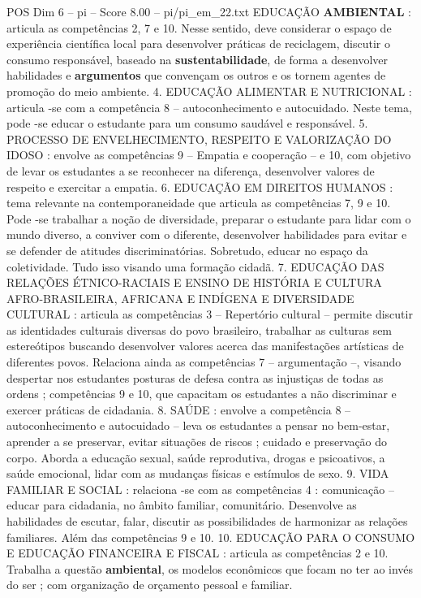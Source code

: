 \begin{textsample}{POS Dim 6 – pi – Score 8.00 – pi/pi\_em\_22.txt}
EDUCAÇÃO \textbf{AMBIENTAL} : articula as competências 2, 7 e 10.
Nesse sentido, deve considerar o espaço de experiência científica local para desenvolver práticas de reciclagem, discutir o consumo responsável, baseado na \textbf{sustentabilidade}, de forma a desenvolver habilidades e \textbf{argumentos} que convençam os outros e os tornem agentes de promoção do meio ambiente. 4.
EDUCAÇÃO ALIMENTAR E NUTRICIONAL : articula -se com a competência 8 – autoconhecimento e autocuidado.
Neste tema, pode -se educar o estudante para um consumo saudável e responsável. 5.
PROCESSO DE ENVELHECIMENTO, RESPEITO E VALORIZAÇÃO DO IDOSO : envolve as competências 9 – Empatia e cooperação – e 10, com objetivo de levar os estudantes a se reconhecer na diferença, desenvolver valores de respeito e exercitar a empatia. 6.
EDUCAÇÃO EM DIREITOS HUMANOS : tema relevante na contemporaneidade que articula as competências 7, 9 e 10.
Pode -se trabalhar a noção de diversidade, preparar o estudante para lidar com o mundo diverso, a conviver com o diferente, desenvolver habilidades para evitar e se defender de atitudes discriminatórias.
Sobretudo, educar no espaço da coletividade.
Tudo isso visando uma formação cidadã. 7.
EDUCAÇÃO DAS RELAÇÕES ÉTNICO-RACIAIS E ENSINO DE HISTÓRIA E CULTURA AFRO-BRASILEIRA, AFRICANA E INDÍGENA E DIVERSIDADE CULTURAL : articula as competências 3 – Repertório cultural – permite discutir as identidades culturais diversas do povo brasileiro, trabalhar as culturas sem estereótipos buscando desenvolver valores acerca das manifestações artísticas de diferentes povos.
Relaciona ainda as competências 7 – argumentação –, visando despertar nos estudantes posturas de defesa contra as injustiças de todas as ordens ; competências 9 e 10, que capacitam os estudantes a não discriminar e exercer práticas de cidadania. 8.
SAÚDE : envolve a competência 8 – autoconhecimento e autocuidado – leva os estudantes a pensar no bem-estar, aprender a se preservar, evitar situações de riscos ; cuidado e preservação do corpo.
Aborda a educação sexual, saúde reprodutiva, drogas e psicoativos, a saúde emocional, lidar com as mudanças físicas e estímulos de sexo. 9.
VIDA FAMILIAR E SOCIAL : relaciona -se com as competências 4 : comunicação – educar para cidadania, no âmbito familiar, comunitário.
Desenvolve as habilidades de escutar, falar, discutir as possibilidades de harmonizar as relações familiares.
Além das competências 9 e 10. 10.
EDUCAÇÃO PARA O CONSUMO E EDUCAÇÃO FINANCEIRA E FISCAL : articula as competências 2 e 10.
Trabalha a questão \textbf{ambiental}, os modelos econômicos que focam no ter ao invés do ser ; com organização de orçamento pessoal e familiar.

\end{textsample}
